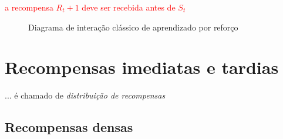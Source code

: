 \documentclass{article}
\begin{document}
            \textcolor{red}{a recompensa $R_t+1$ deve ser recebida antes de $S_t$}
        
            \begin{figure}[ht]
                \centering
                \rlinteraction
                \caption{Diagrama de interação clássico de aprendizado por reforço}
                \label{diag:classical-rl}
            \end{figure}
            
                \section{Recompensas imediatas e tardias}
    
        ... é chamado de \emph{distribuição de recompensas}
    
        \subsection{Recompensas densas}
        
\end{document}
